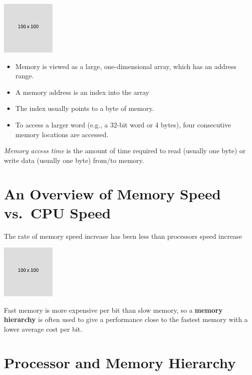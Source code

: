 \documentclass[
  16pt,
  a4paper,
]{report}
\begin{document}
\includegraphics{index_files/mediabag/FiKGhYhhIWJYiBgWIoaF.png}

\begin{itemize}
\item
  Memory is viewed as a large, one-dimensional array, which has an
  address range.
\item
  A memory address is an index into the array
\item
  The index usually points to a byte of memory.
\item
  To access a larger word (e.g., a 32-bit word or 4 bytes), four
  consecutive memory locations are accessed.
\end{itemize}

\emph{Memory access time} is the amount of time required to read
(usually one byte) or write data (usually one byte) from/to memory.

\section{An Overview of Memory Speed vs.~CPU
Speed}\label{an-overview-of-memory-speed-vs.-cpu-speed}

The rate of memory speed increase has been less than processors speed
increase

\includegraphics{index_files/mediabag/FiKGhYhhIWJYiBgWIoaF.png}

Fast memory is more expensive per bit than slow memory, so a
\textbf{memory hierarchy} is often used to give a performance close to
the fastest memory with a lower average cost per bit.

\section{Processor and Memory
Hierarchy}\label{processor-and-memory-hierarchy}
\end{document}
